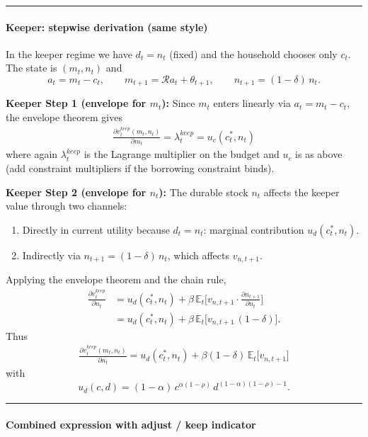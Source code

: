 \bigskip
\hrule
\bigskip

\paragraph{Keeper: stepwise derivation (same style)}

In the keeper regime we have \(d_t = n_t\) (fixed) and the household chooses only \(c_t\). The state is \((m_t,n_t)\) and
\[
a_t = m_t - c_t, \qquad
m_{t+1} = \mathcal{R}a_t + \theta_{t+1}, \qquad
n_{t+1} = (1-\delta)\,n_t.
\]

\textbf{Keeper Step 1 (envelope for \(m_t\)):} Since \(m_t\) enters linearly via \(a_t=m_t-c_t\), the envelope theorem gives
\begin{align}
		\frac{\partial v_t^{keep}(m_t,n_t)}{\partial m_t}
		= \lambda_t^{keep}
		= u_c(c_t^\ast,n_t)
\label{eq:keep_m_basic}
\end{align}
where again \(\lambda_t^{keep}\) is the Lagrange multiplier on the budget and \(u_c\) is as above (add constraint multipliers if the borrowing constraint binds).

\textbf{Keeper Step 2 (envelope for \(n_t\)):} The durable stock \(n_t\) affects the keeper value through two channels:
\begin{enumerate}
	\item Directly in current utility because \(d_t=n_t\): marginal contribution \(u_d(c_t^\ast,n_t)\).
	\item Indirectly via \(n_{t+1} = (1-\delta)\,n_t\), which affects \(v_{n,t+1}\).
\end{enumerate}
Applying the envelope theorem and the chain rule,
\begin{align}
	\frac{\partial v_t^{keep}}{\partial n_t}
	&= u_d(c_t^\ast,n_t)
	+ \beta\,\mathbb{E}_t\Bigg[ v_{n,t+1}\cdot\frac{\partial n_{t+1}}{\partial n_t}\Bigg] \\
	&= u_d(c_t^\ast,n_t)
	+ \beta\,\mathbb{E}_t\Bigg[ v_{n,t+1}\,(1-\delta)\Bigg].
\end{align}
Thus
\begin{align}
		\frac{\partial v_t^{keep}(m_t,n_t)}{\partial n_t}
		= u_d(c_t^\ast,n_t)
		+ \beta (1-\delta)\, \mathbb{E}_t\big[ v_{n,t+1}\big]
\label{eq:keep_n_basic}
\end{align}
with
\[
u_d(c,d) = (1-\alpha)\, c^{\alpha(1-\rho)}\, d^{(1-\alpha)(1-\rho)-1}.
\]

\bigskip
\hrule
\bigskip

\paragraph{Combined expression with adjust / keep indicator}

